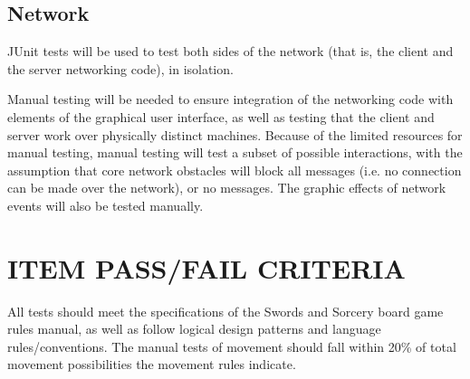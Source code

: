 \subsection{Network}
JUnit tests will be used to test both sides of the network (that is,
the client and the server networking code), in isolation.

Manual testing will be needed to ensure integration of the networking
code with elements of the graphical user interface, as well as testing
that the client and server work over physically distinct machines.
Because of the limited resources for manual testing, manual testing
will test a subset of possible interactions, with the assumption that
core network obstacles will block all messages (i.e. no connection can
be made over the network), or no messages. The graphic effects of
network events will also be tested manually.


\section[ITEM PASS/FAIL CRITERIA]{\bfseries\color{black}
	 ITEM PASS/FAIL CRITERIA}
{\color{black}
All tests should meet the specifications of the Swords and Sorcery board game rules manual, as well as follow logical design patterns and language rules/conventions. The manual tests of movement should fall within 20\% of total movement possibilities the movement rules indicate.
}

